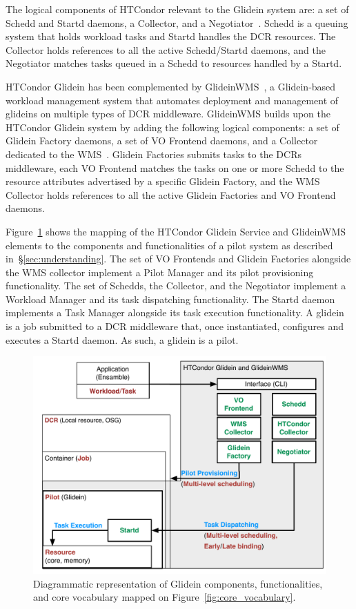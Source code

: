 \documentclass{sig-alternate}
\begin{document}
The logical components of HTCondor relevant to the Glidein system are: a set of Schedd and
Startd daemons, a Collector, and a Negotiator~\cite{glidein_presentation_url}.
Schedd is a queuing system that holds workload tasks and Startd handles the DCR
resources. The Collector holds references to all the active Schedd/Startd
daemons, and the Negotiator matches tasks queued in a Schedd to resources
handled by a Startd.

HTCondor Glidein has been complemented by
GlideinWMS~\cite{sfiligoi2008glideinwms}, a Glidein-based workload management
system that automates deployment and management of glideins on multiple types of
DCR middleware. GlideinWMS builds upon the HTCondor Glidein system by adding the
following logical components: a set of Glidein Factory daemons, a set of VO Frontend
daemons, and a Collector dedicated to the
WMS~\cite{glideinwms_url,glideinwms_manual_url}. Glidein Factories submits tasks
to the DCRs middleware, each VO Frontend matches the tasks on one or more Schedd
to the resource attributes advertised by a specific Glidein Factory, and the WMS
Collector holds references to all the active Glidein Factories and VO Frontend
daemons.


Figure~\ref{fig:glidein_comparison} shows the mapping of the HTCondor Glidein
Service and GlideinWMS elements to the components and functionalities of a pilot
system as described in~\S\ref{sec:understanding}. The set of VO Frontends and
Glidein Factories alongside the WMS collector implement a Pilot Manager and its
pilot provisioning functionality. The set of Schedds, the Collector, and the
Negotiator implement a Workload Manager and its task dispatching functionality.
The Startd daemon implements a Task Manager alongside its task execution
functionality. A glidein is a job submitted to a DCR middleware that, once
instantiated, configures and executes a Startd daemon. As such, a glidein is a
pilot.

\begin{figure}[t]
    \centering
        \includegraphics[width=.48\textwidth]{figures/glidein_comparison.pdf}
        \caption{Diagrammatic representation of Glidein components,
          functionalities, and core vocabulary mapped on
          Figure~\ref{fig:core_vocabulary}.}
    \label{fig:glidein_comparison}
\end{figure}
\end{document}
